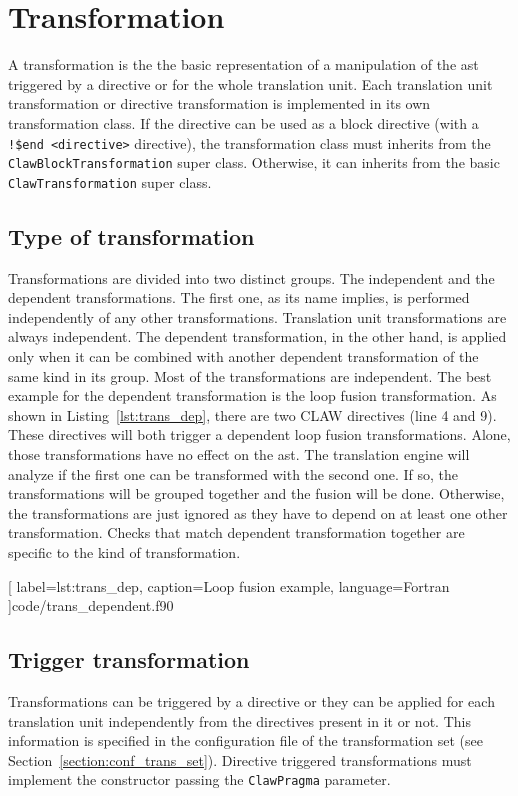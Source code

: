 \chapter{Transformation}
\label{chapter:transformation}
A transformation is the the basic representation of a manipulation of the
\gls{ast} triggered by a directive or for the whole translation unit. Each
translation unit transformation or directive transformation is implemented in
its own transformation class. If the directive can be used as a block directive
(with a \lstinline|!$end <directive>| directive), the transformation class must
inherits from the \lstinline!ClawBlockTransformation! super class. Otherwise,
it can inherits from the basic \lstinline!ClawTransformation! super class.

\section{Type of transformation}
\label{section:trans_type}
Transformations are divided into two distinct groups. The independent and the
dependent transformations. The first one, as its name implies, is performed
independently of any other transformations. Translation unit transformations
are always independent.
The dependent transformation, in the
other hand, is applied only when it can be combined with another dependent
transformation of the same kind in its group. Most of the transformations are
independent. The best example for the dependent transformation is the loop
fusion transformation. As shown in Listing~\ref{lst:trans_dep}, there are two
CLAW directives (line 4 and 9). These directives will both trigger a dependent
loop fusion transformations. Alone, those transformations have no effect
on the \gls{ast}. The translation engine will analyze if the
first one can be transformed with the second one. If so, the transformations
will be grouped together and the fusion will be done. Otherwise, the
transformations are just ignored as they have to depend on at least one other
transformation. Checks that match dependent transformation together are
specific to the kind of transformation.


  [
    label=lst:trans_dep,
    caption=Loop fusion example,
    language=Fortran
  ]{code/trans_dependent.f90}

\section{Trigger transformation}
\label{section:trans_trigger}
Transformations can be triggered by a directive or they can be applied for each
translation unit independently from the directives present in it or not.
This information is specified in the configuration file of the transformation
set (see Section~\ref{section:conf_trans_set}). Directive triggered
transformations must implement the constructor passing the
\lstinline|ClawPragma| parameter.


